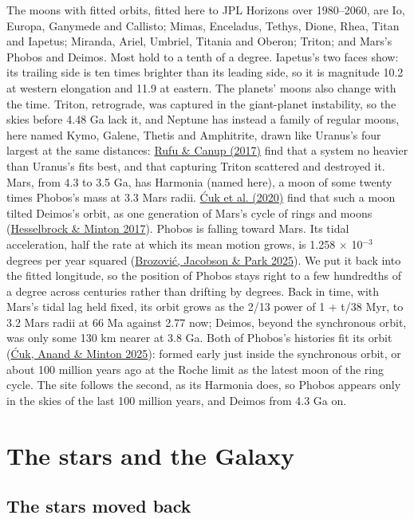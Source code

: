 \documentclass[9pt,twocolumn]{extarticle}
\begin{document}
The moons with fitted orbits, fitted here to JPL Horizons over 1980--2060, are Io, Europa, Ganymede and Callisto; Mimas, Enceladus, Tethys, Dione, Rhea, Titan and Iapetus; Miranda, Ariel, Umbriel, Titania and Oberon; Triton; and Mars's Phobos and Deimos. Most hold to a tenth of a degree. Iapetus's two faces show: its trailing side is ten times brighter than its leading side, so it is magnitude 10.2 at western elongation and 11.9 at eastern. The planets' moons also change with the time. Triton, retrograde, was captured in the giant-planet instability, so the skies before 4.48 Ga lack it, and Neptune has instead a family of regular moons, here named Kymo, Galene, Thetis and Amphitrite, drawn like Uranus's four largest at the same distances: \protect\hyperlink{cite.rufu2017}{Rufu \& Canup (2017)} find that a system no heavier than Uranus's fits best, and that capturing Triton scattered and destroyed it. Mars, from 4.3 to 3.5 Ga, has Harmonia (named here), a moon of some twenty times Phobos's mass at 3.3 Mars radii. \protect\hyperlink{cite.cuk2020}{Ćuk et al. (2020)} find that such a moon tilted Deimos's orbit, as one generation of Mars's cycle of rings and moons (\protect\hyperlink{cite.hesselbrock2017}{Hesselbrock \& Minton 2017}). Phobos is falling toward Mars. Its tidal acceleration, half the rate at which its mean motion grows, is 1.258 $\times$ 10$^{-3}$ degrees per year squared (\protect\hyperlink{cite.brozovic2025}{Brozović, Jacobson \& Park 2025}). We put it back into the fitted longitude, so the position of Phobos stays right to a few hundredths of a degree across centuries rather than drifting by degrees. Back in time, with Mars's tidal lag held fixed, its orbit grows as the 2/13 power of 1 + t/38 Myr, to 3.2 Mars radii at 66 Ma against 2.77 now; Deimos, beyond the synchronous orbit, was only some 130 km nearer at 3.8 Ga. Both of Phobos's histories fit its orbit (\protect\hyperlink{cite.cuk2025}{Ćuk, Anand \& Minton 2025}): formed early just inside the synchronous orbit, or about 100 million years ago at the Roche limit as the latest moon of the ring cycle. The site follows the second, as its Harmonia does, so Phobos appears only in the skies of the last 100 million years, and Deimos from 4.3 Ga on.


\section{The stars and the Galaxy}\label{stars}


\subsection{The stars moved back}\label{the-stars-moved-back}
\end{document}

